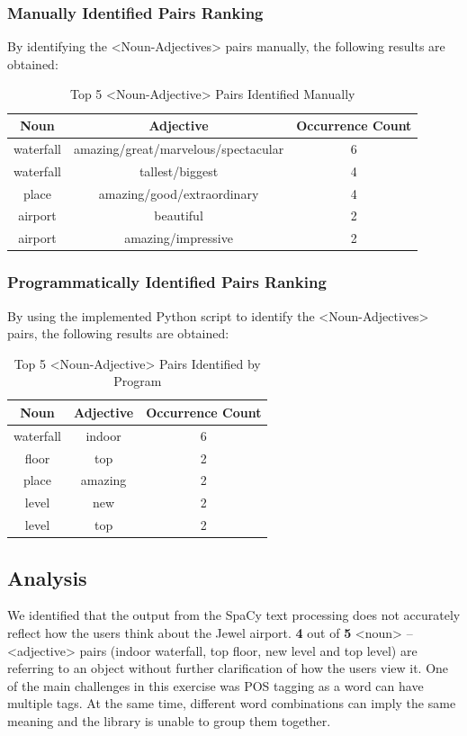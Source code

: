 \documentclass[sigconf,nonacm=true]{acmart}
\begin{document}
\subsubsection{Manually Identified Pairs Ranking}
By identifying the <Noun-Adjectives> pairs manually, the following results are obtained:
\begin{table}[H]
	\label{tab:manualpairs}
	\begin{adjustbox}{width=\columnwidth}
	\begin{tabular}{ccc}
		\toprule
		Noun&Adjective&Occurrence Count\\
		\midrule
		waterfall & amazing/great/marvelous/spectacular & 6 \\
		waterfall & tallest/biggest & 4 \\
		place & amazing/good/extraordinary & 4 \\
		airport & beautiful & 2 \\
		airport & amazing/impressive & 2 \\
		\bottomrule
	\end{tabular}
	\end{adjustbox}
	\caption{Top 5 <Noun-Adjective> Pairs Identified Manually}
\end{table}


\subsubsection{Programmatically Identified Pairs Ranking}
By using the implemented Python script to identify the <Noun-Adjectives> pairs, the following results are obtained:
\begin{table}[H]
	\label{tab:progpairs}
	\begin{tabular}{ccc}
		\toprule
		Noun&Adjective&Occurrence Count\\
		\midrule
		waterfall & indoor & 6 \\
		floor & top & 2 \\
		place & amazing & 2 \\
		level & new & 2 \\
		level & top & 2 \\
		\bottomrule
	\end{tabular}
	\caption{Top 5 <Noun-Adjective> Pairs Identified by Program}
\end{table}

\subsection{Analysis}
We identified that the output from the SpaCy text processing does not accurately reflect how the users think about the Jewel airport. \textbf{4} out of \textbf{5} <noun> – <adjective> pairs  (indoor waterfall, top floor, new level and top level) are referring to an object without further clarification of how the users view it.  One of the main challenges in this exercise was POS tagging as a word can have multiple tags. At the same time, different word combinations can imply the same meaning and the library is unable to group them together.
\end{document}
